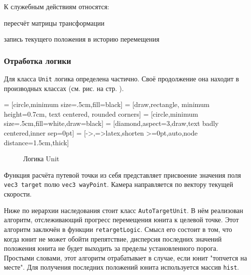 К служебным действиям относятся:
\begin{mintemize}
\item пересчёт матрицы трансформации
\item запись текущего положения в историю перемещения
\end{mintemize}

\newpage
\subsubsection{Отработка логики}

Для класса \verb|Unit| логика определена частично. Своё продолжение
она находит в производных классах (см. рис.  на стр. \pageref{fig:model_uml}).

 = [circle,minimum size=.5cm,fill=black]
 = [draw,rectangle, minimum height=0.7cm,
            text centered, rounded corners]
 = [circle,minimum size=.5cm,fill=white,draw=black]
 = [diamond,aspect=3,draw,text badly centered,inner sep=0pt]
 = [->,=>latex,shorten >=0pt,auto,node distance=1.5cm,thick]

\begin{figure}[h!]

    \centering


    \caption{Логика Unit}
    \label{fig:unit_algo_logic}
\end{figure}

Функция расчёта путевой точки из себя представляет присвоение значения поля \verb|vec3 target|
полю \verb|vec3 wayPoint|. Камера направляется по вектору текущей скорости.

Ниже по иерархии наследования стоит класс \verb|AutoTargetUnit|. В нём реализован
алгоритм, отслеживающий прогресс перемещения юнита к целевой точке. Этот алгоритм
заключён в функции \verb|retargetLogic|. Смысл его состоит в том, что когда юнит
не может обойти препятствие, дисперсия последних значений положения юнита не
будет выходить за пределы установленного порога. Простыми словами, этот
алгоритм отрабатывает в случае, если юнит "топчется на месте". Для получения
последних положений юнита используется массив \verb|hist|.

